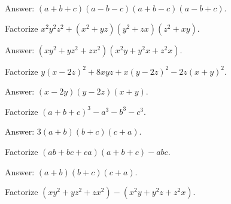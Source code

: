 \begin{solution}[name=Solution by Parviz Shahriari]
Answer: $(a+b+c)(a-b-c)(a+b-c)(a-b+c)$.
\end{solution}


\begin{tcolorbox}
\begin{question}
Factorize $x^2y^2z^2 + (x^2+yz)(y^2+zx)(z^2+xy)$.
\end{question}
\end{tcolorbox}

\begin{solution}
Answer: $(xy^2+yz^2+zx^2)(x^2y+y^2x+z^2x)$.
\end{solution}



\begin{tcolorbox}
\begin{question}
Factorize $y(x-2z)^2 + 8xyz + x(y-2z)^2 - 2z (x+y)^2$.
\end{question}
\end{tcolorbox}

\begin{solution}[name=Solution by Parviz Shahriari]
Answer: $(x-2y)(y-2z)(x+y)$.
\end{solution}




\begin{tcolorbox}
\begin{question}
Factorize $(a+b+c)^3 - a^3 - b^3 - c^3$.
\end{question}
\end{tcolorbox}

\begin{solution}[name=Solution by Parviz Shahriari]
Answer: $3(a+b)(b+c)(c+a)$.
\end{solution}




\begin{tcolorbox}
\begin{question}
Factorize $(ab+bc+ca)(a+b+c)-abc$.
\end{question}
\end{tcolorbox}

\begin{solution}[name=Solution by Parviz Shahriari]
Answer: $(a+b)(b+c)(c+a)$.
\end{solution}


\begin{tcolorbox}
\begin{question}
Factorize $(xy^2+yz^2+zx^2)-(x^2y+y^2z+z^2x)$.
\end{question}
\end{tcolorbox}

